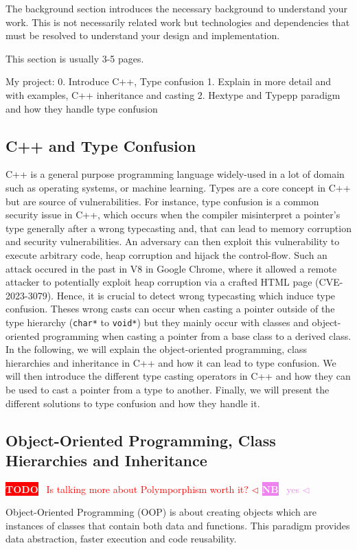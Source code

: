 \documentclass[a4paper,11pt,oneside]{report}
\newcommand{\todobox}[3]{%
       \colorbox{#1}{\textcolor{white}{\sffamily\bfseries\scriptsize #2}}%
       ~\textcolor{#1}{#3} %
       \textcolor{#1}{$\triangleleft$}%
}
\newcommand{\nb}[1]{\todobox{violet}{NB}{#1}}
\newcommand{\adrbqt}[1]{\todobox{red}{TODO}{#1}}
\begin{document}
The background section introduces the necessary background to understand your
work. This is not necessarily related work but technologies and dependencies
that must be resolved to understand your design and implementation.

This section is usually 3-5 pages.

My project:
0. Introduce C++, Type confusion
1. Explain in more detail and with examples, C++ inheritance and casting
2. Hextype and Typepp paradigm and how they handle type confusion

\subsection{C++ and Type Confusion}

C++ is a general purpose programming language widely-used in a lot of domain such as operating systems, 
or machine learning. Types are a core concept in C++ but are source of vulnerabilities. For instance, type confusion 
is a common security issue in C++, which occurs when the compiler misinterpret a pointer's type generally after a wrong typecasting and,
that can lead to memory corruption and security vulnerabilities. An adversary can then exploit this vulnerability to execute arbitrary code, heap corruption and hijack the control-flow.
Such an attack occured in the past in V8 in Google Chrome, where it allowed a remote attacker to potentially exploit
heap corruption via a crafted HTML page (CVE-2023-3079). Hence, it is crucial to detect wrong typecasting which induce type confusion. 
Theses wrong casts can occur when casting a pointer outside of the type hierarchy (\texttt{char*} to \texttt{void*}) but they mainly occur with classes and object-oriented programming 
when casting a pointer from a base class to a derived class. In the following, we will explain the object-oriented programming, class hierarchies and inheritance in C++ and how it can lead to type confusion. 
We will then introduce the different type casting operators in C++ and how they can be used to cast a pointer from a type to another. Finally, we will present the different solutions to type confusion and how they handle it.

\subsection{Object-Oriented Programming, Class Hierarchies and Inheritance}
\adrbqt{Is talking more about Polymporphism worth it?}\nb{yes}
Object-Oriented Programming (OOP) is about creating objects which are instances of classes that contain both data and functions. This paradigm provides
data abstraction, faster execution and code reusability. 
\end{document}
